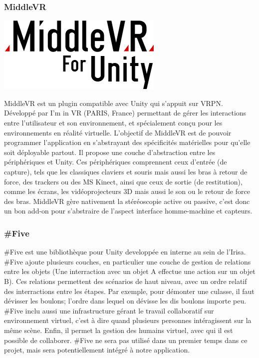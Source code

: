 	\subsubsection{MiddleVR}
		\noindent\begin{minipage}{0.3\textwidth}
			\includegraphics[width=\linewidth]{1-PreEtude/img/middlevr_logo}
			\end{minipage}
			\hfill
			\begin{minipage}{0.6\textwidth}\raggedleft
			MiddleVR est un plugin compatible avec Unity qui s'appuit sur  VRPN. Développé par I’m in VR (PARIS, France) permettant de gérer les interactions entre l’utilisateur et son environnement, et spécialement conçu pour les environnements en réalité virtuelle. 
			L'objectif de MiddleVR est de pouvoir programmer l'application en s'abstrayant des spécificités matérielles pour qu'elle soit déployable partout.
			Il propose une couche d’abstraction entre les périphériques et Unity. Ces périphériques comprennent ceux d’entrée (de capture), tels que les classiques claviers et souris mais aussi les bras à retour de force, des trackers ou des MS Kinect, ainsi que ceux de sortie (de restitution), comme les écrans, les vidéoprojecteurs 3D mais aussi le son ou le retour de force des bras. 
			MiddleVR gère nativement la stéréoscopie active ou passive, c'est donc un bon add-on pour s'abstraire de l'aspect interface	homme-machine et capteurs.
		\end{minipage}
		

	\subsubsection{\#Five}
		\#Five est une bibliothèque pour Unity developpée en interne au sein de l’Irisa. \#Five ajoute plusieurs couches, en particulier une couche de gestion de relations entre les objets (Une interraction avec un objet A effectue une action sur un objet B).
		Ces relations permettent des scénarios de haut niveau, avec un ordre relatif des interractions entre les étapes. Par exemple, pour démonter une culasse, il faut dévisser les boulons; l'ordre dans lequel on dévisse les dis boulons importe peu.
		\#Five inclu aussi une infrastructure gérant le travail collaboratif sur environnement virtuel, c'est à dire quand plusieurs personnes intéragissent sur la même scène.
		Enfin, il permet la gestion des humains virtuel, avec qui il est possible de collaborer.
		\#Five ne sera pas utilisé dans un premier temps dans ce projet, mais sera potentiellement intégré à notre application.


